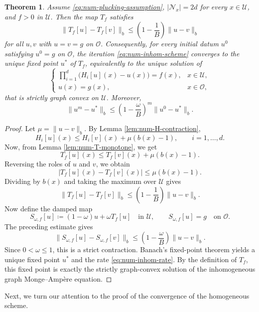 \documentclass[reqno,11pt]{amsart}
\numberwithin{equation}{section}
\newtheorem{theorem}{Theorem}[section]
\theoremstyle{definition}
\theoremstyle{remark}
\begin{document}
\begin{theorem}\label{thm:num-inhom-convergence}
Assume \eqref{eq:num-plucking-assumption}, \(|\mathcal N_x|=2d\) for every \(x\in \mathcal{U}\), and \(f>0\) in \(\mathcal{U}\).  Then the map \(T_f\) satisfies
\[
    \|T_f[u]-T_f[v]\|_b
    \le
    \left(1-\frac1B\right)\|u-v\|_b
\]
for all \(u,v\) with \(u=v=g\) on \(\mathcal O\). Consequently, for every initial datum $u^0$ satisfying $u^0=g$ on $\mathcal O$, the iteration \eqref{eq:num-inhom-scheme} converges to the unique fixed point $u^\ast$ of $T_f$, equivalently to the unique solution of
\[
    \begin{cases}
    \displaystyle
    \prod_{i=1}^d\bigl(H_i[u](x)-u(x)\bigr)=f(x),
    &x\in \mathcal{U},\\[1ex]
    u(x)=g(x),
    &x\in\mathcal O,
    \end{cases}
\]
that is strictly graph convex on $\mathcal{U}$. Moreover,
\begin{equation}\label{eq:num-inhom-rate}
    \|u^m-u^\ast\|_b
    \le
    \left(1-\frac{\omega}{B}\right)^m
    \|u^0-u^\ast\|_b .
\end{equation}
\end{theorem}

\begin{proof}
Let \(\mu=\|u-v\|_b\). By Lemma \ref{lem:num-H-contraction},
\[
    H_i[u](x)
    \le
    H_i[v](x)+\mu(b(x)-1),
    \qquad i=1,\dots,d.
\]
Now, from Lemma \ref{lem:num-T-monotone},
we get
\[
    T_f[u](x)
    \le
    T_f[v](x)+\mu(b(x)-1).
\]
Reversing the roles of \(u\) and \(v\), we obtain
\[
    |T_f[u](x)-T_f[v](x)|
    \le
    \mu(b(x)-1).
\]
Dividing by \(b(x)\) and taking the maximum over \(\mathcal{U}\) gives
\[
    \|T_f[u]-T_f[v]\|_b
    \le
    \left(1-\frac1B\right)\|u-v\|_b.
\]
Now define the damped map
\[
    S_{\omega,f}[u]
    \coloneqq
    (1-\omega)u+\omega T_f[u]
    \quad\text{in }\mathcal{U},
    \qquad
    S_{\omega,f}[u]=g
    \quad\text{on }\mathcal O.
\]
The preceding estimate gives
\[
    \|S_{\omega,f}[u]-S_{\omega,f}[v]\|_b
    \le
    \left(1-\frac{\omega}{B}\right)\|u-v\|_b.
\]
Since \(0<\omega\le1\), this is a strict contraction. Banach's fixed-point theorem yields a unique fixed point \(u^\ast\) and the rate \eqref{eq:num-inhom-rate}. By the definition of \(T_f\), this fixed point is exactly the strictly graph-convex solution of the inhomogeneous graph Monge--Amp\`ere equation.
\end{proof}

Next, we turn our attention to the proof of the convergence of the homogeneous scheme.
\end{document}
